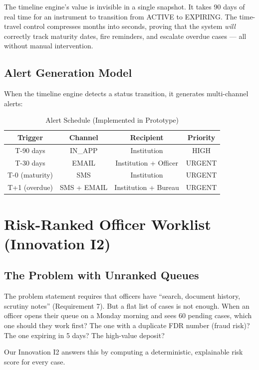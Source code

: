 \documentclass[12pt, a4paper]{report}
\begin{document}
\begin{designbox}[title={Why Time-Travel Is Essential for a Hackathon Demo}]
The timeline engine's value is invisible in a single snapshot. It takes 90 days of real time for an instrument to transition from ACTIVE to EXPIRING. The time-travel control compresses months into seconds, proving that the system \textit{will} correctly track maturity dates, fire reminders, and escalate overdue cases --- all without manual intervention.
\end{designbox}

\section{Alert Generation Model}

When the timeline engine detects a status transition, it generates multi-channel alerts:

\begin{table}[H]
\centering
\caption{Alert Schedule (Implemented in Prototype)}
\label{tab:alerts}
\begin{tabular}{|c|c|c|c|}
\hline
\textbf{Trigger} & \textbf{Channel} & \textbf{Recipient} & \textbf{Priority} \\
\hline
T-90 days & IN\_APP & Institution & HIGH \\
T-30 days & EMAIL & Institution + Officer & URGENT \\
T-0 (maturity) & SMS & Institution & URGENT \\
T+1 (overdue) & SMS + EMAIL & Institution + Bureau & URGENT \\
\hline
\end{tabular}
\end{table}


\chapter{Risk-Ranked Officer Worklist (Innovation I2)}

\section{The Problem with Unranked Queues}

\begin{connectionbox}
The problem statement requires that officers have ``search, document history, scrutiny notes'' (Requirement 7). But a flat list of cases is not enough. When an officer opens their queue on a Monday morning and sees 60 pending cases, which one should they work first? The one with a duplicate FDR number (fraud risk)? The one expiring in 5 days? The high-value deposit?

Our Innovation I2 answers this by computing a deterministic, explainable risk score for every case.
\end{connectionbox}
\end{document}
